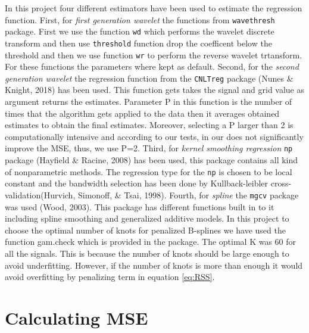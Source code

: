 \documentclass[12pt,twoside, a4paper]{reedthesis}
\begin{document}
In this project four different estimators have been used to estimate the regression function. First, for \emph{first generation wavelet} the functions from \texttt{wavethresh} package. First we use the function \texttt{wd} which performs the wavelet discrete transform and then use \texttt{threshold} function drop the coefficent below the threshold and then we use function \texttt{wr} to perform the reverse wavelet trtansform. For these functions the parameters where kept as default. Second, for the \emph{second generation wavelet} the regression function from the \texttt{CNLTreg} package (Nunes \& Knight, 2018) has been used. This function gets takes the signal and grid value as argument returns the estimates. Parameter P in this
function is the number of times that the algorithm gets applied to the data then it
averages obtained estimates to obtain the final estimates. Moreover, selecting a P larger
than 2 is computationally intensive and according to our tests, in our does not
significantly improve the MSE, thus, we use P=2. Third, for \emph{kernel smoothing regression} \texttt{np} package (Hayfield \& Racine, 2008) has been used, this package contains all kind of nonparametric methods. The regression type for the \texttt{np} is chosen to be local constant and the bandwidth selection has been done by Kullback-leibler cross-validation(Hurvich, Simonoff, \& Tsai, 1998). Fourth, for \emph{spline} the \texttt{mgcv} package was used (Wood, 2003). This package has different functions built in to it including spline smoothing and generalized additive models. In this project to choose the optimal number of knots for penalized B-splines we have used the function gam.check which is provided in the package. The optimal K was 60 for all the signals. This is because the number of knots should be large enough to avoid underfitting. However, if the number of knots is more than enough it would avoid overfitting by penalizing term in equation \eqref{eq:RSS}.

\hypertarget{calculating-mse}{%
\section{Calculating MSE}\label{calculating-mse}}
\end{document}
